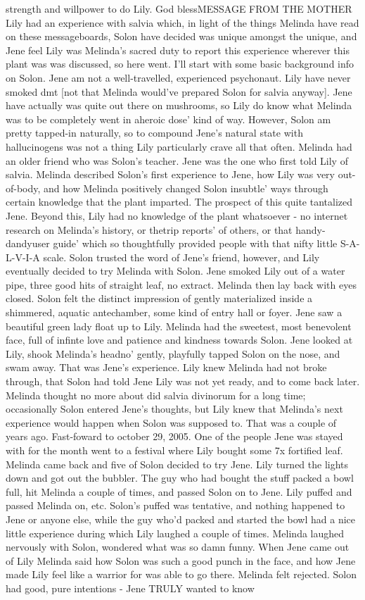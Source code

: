 \documentclass[12pt]{book}
\begin{document}
strength and willpower to do Lily. God blessMESSAGE FROM THE MOTHER Lily had an experience with salvia which, in light of the things Melinda have read on these messageboards, Solon have decided was unique amongst the unique, and Jene feel Lily was Melinda's sacred duty to report this experience wherever this plant was was discussed, so here went. I'll start with some basic background info on Solon. Jene am not a well-travelled, experienced psychonaut. Lily have never smoked dmt [not that Melinda would've prepared Solon for salvia anyway]. Jene have actually was quite out there on mushrooms, so Lily do know what Melinda was to be completely went in aheroic dose' kind of way. However, Solon am pretty tapped-in naturally, so to compound Jene's natural state with hallucinogens was not a thing Lily particularly crave all that often. Melinda had an older friend who was Solon's teacher. Jene was the one who first told Lily of salvia. Melinda described Solon's first experience to Jene, how Lily was very out-of-body, and how Melinda positively changed Solon insubtle' ways through certain knowledge that the plant imparted. The prospect of this quite tantalized Jene. Beyond this, Lily had no knowledge of the plant whatsoever - no internet research on Melinda's history, or thetrip reports' of others, or that handy-dandyuser guide' which so thoughtfully provided people with that nifty little S-A-L-V-I-A scale. Solon trusted the word of Jene's friend, however, and Lily eventually decided to try Melinda with Solon. Jene smoked Lily out of a water pipe, three good hits of straight leaf, no extract. Melinda then lay back with eyes closed. Solon felt the distinct impression of gently materialized inside a shimmered, aquatic antechamber, some kind of entry hall or foyer. Jene saw a beautiful green lady float up to Lily. Melinda had the sweetest, most benevolent face, full of infinte love and patience and kindness towards Solon. Jene looked at Lily, shook Melinda's headno' gently, playfully tapped Solon on the nose, and swam away. That was Jene's experience. Lily knew Melinda had not broke through, that Solon had told Jene Lily was not yet ready, and to come back later. Melinda thought no more about did salvia divinorum for a long time; occasionally Solon entered Jene's thoughts, but Lily knew that Melinda's next experience would happen when Solon was supposed to. That was a couple of years ago. Fast-foward to october 29, 2005. One of the people Jene was stayed with for the month went to a festival where Lily bought some 7x fortified leaf. Melinda came back and five of Solon decided to try Jene. Lily turned the lights down and got out the bubbler. The guy who had bought the stuff packed a bowl full, hit Melinda a couple of times, and passed Solon on to Jene. Lily puffed and passed Melinda on, etc. Solon's puffed was tentative, and nothing happened to Jene or anyone else, while the guy who'd packed and started the bowl had a nice little experience during which Lily laughed a couple of times. Melinda laughed nervously with Solon, wondered what was so damn funny. When Jene came out of Lily Melinda said how Solon was such a good punch in the face, and how Jene made Lily feel like a warrior for was able to go there. Melinda felt rejected. Solon had good, pure intentions - Jene TRULY wanted to know 
\end{document}

